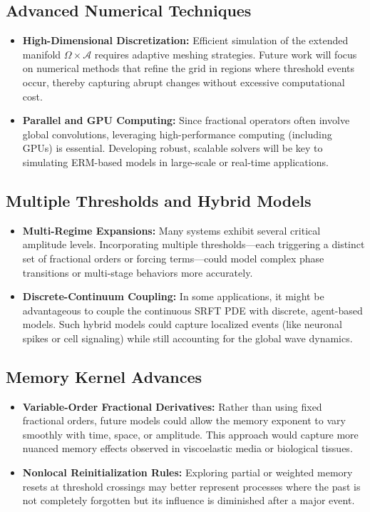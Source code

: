 \documentclass[12pt]{article}
\begin{document}
\medskip
\subsection{Advanced Numerical Techniques}
\begin{itemize}
    \item \textbf{High-Dimensional Discretization:}  
          Efficient simulation of the extended manifold $\Omega \times \mathcal{A}$ requires adaptive meshing strategies. Future work will focus on numerical methods that refine the grid in regions where threshold events occur, thereby capturing abrupt changes without excessive computational cost.
    \item \textbf{Parallel and GPU Computing:}  
          Since fractional operators often involve global convolutions, leveraging high-performance computing (including GPUs) is essential. Developing robust, scalable solvers will be key to simulating ERM-based models in large-scale or real-time applications.
\end{itemize}

\medskip
\subsection{Multiple Thresholds and Hybrid Models}
\begin{itemize}
    \item \textbf{Multi-Regime Expansions:}  
          Many systems exhibit several critical amplitude levels. Incorporating multiple thresholds—each triggering a distinct set of fractional orders or forcing terms—could model complex phase transitions or multi-stage behaviors more accurately.
    \item \textbf{Discrete-Continuum Coupling:}  
          In some applications, it might be advantageous to couple the continuous SRFT PDE with discrete, agent-based models. Such hybrid models could capture localized events (like neuronal spikes or cell signaling) while still accounting for the global wave dynamics.
\end{itemize}

\medskip
\subsection{Memory Kernel Advances}
\begin{itemize}
    \item \textbf{Variable-Order Fractional Derivatives:}  
          Rather than using fixed fractional orders, future models could allow the memory exponent to vary smoothly with time, space, or amplitude. This approach would capture more nuanced memory effects observed in viscoelastic media or biological tissues.
    \item \textbf{Nonlocal Reinitialization Rules:}  
          Exploring partial or weighted memory resets at threshold crossings may better represent processes where the past is not completely forgotten but its influence is diminished after a major event.
\end{itemize}
\end{document}
